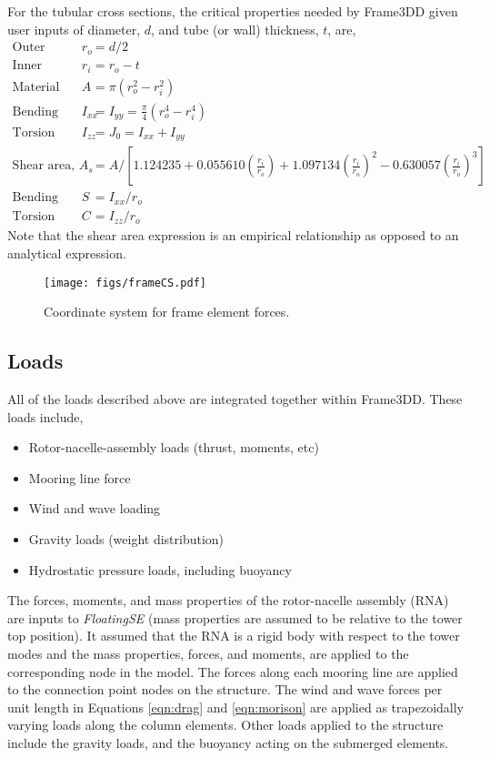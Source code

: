 For the tubular cross sections, the critical properties needed by
Frame3DD given user inputs of diameter, $d$, and tube (or wall)
thickness, $t$, are,
\begin{align*}
  \textrm{Outer radius, } r_o &= d/2\\
  \textrm{Inner radius, } r_i &= r_o - t\\
  \textrm{Material area, } A &= \pi \left( r_o^2 - r_i^2 \right)\\
  \textrm{Bending second moment of area, } I_{xx} &= I_{yy} = \frac{\pi}{4}\left( r_o^4 - r_i^4 \right)\\
  \textrm{Torsion second moment of area, } I_{zz} &= J_0 = I_{xx} + I_{yy}\\
  \textrm{Shear area, } A_{s} &= A / \left[ 1.124235 + 0.055610\left(\frac{r_i}{r_o}\right) +
           1.097134\left(\frac{r_i}{r_o}\right)^2 - 0.630057\left(\frac{r_i}{r_o}\right)^3 \right]\\
  \textrm{Bending modulus, } S &= I_{xx} / r_o \\
  \textrm{Torsion modulus (shear constant), } C &= I_{zz} / r_o
\end{align*}
Note that the shear area expression is an empirical relationship as
opposed to an analytical expression.

\begin{figure}[htb]
  \begin{center}
    \texttt{[image: figs/frameCS.pdf]}
    \caption{Coordinate system for frame element forces.}
    \label{fig:frameCS}
  \end{center}
\end{figure}

\subsection{Loads}
All of the loads described above are integrated together within
Frame3DD.  These loads include,
\begin{itemize}
\item Rotor-nacelle-assembly loads (thrust, moments, etc)
\item Mooring line force
\item Wind and wave loading
\item Gravity loads (weight distribution)
\item Hydrostatic pressure loads, including buoyancy
\end{itemize}

The forces, moments, and mass properties of the rotor-nacelle assembly
(RNA) are inputs to \textit{FloatingSE} (mass properties are assumed to
be relative to the tower top position).  It assumed that the RNA is a
rigid body with respect to the tower modes and the mass properties,
forces, and moments, are applied to the corresponding node in the model.
The forces along each mooring line are applied to the connection
point nodes on the structure.  The wind and wave forces per unit length
in Equations \ref{eqn:drag} and \ref{eqn:morison} are applied as
trapezoidally varying loads along the column elements.  Other loads
applied to the structure include the gravity loads, and the buoyancy
acting on the submerged elements.

